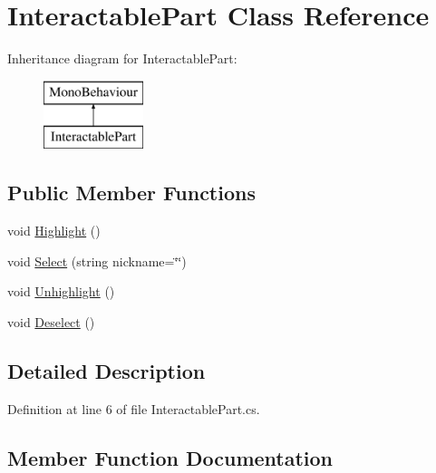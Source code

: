 \hypertarget{class_interactable_part}{}\section{Interactable\+Part Class Reference}
\label{class_interactable_part}
Inheritance diagram for Interactable\+Part\+:\begin{figure}[H]
\begin{center}
\leavevmode
\includegraphics[height=2.000000cm]{class_interactable_part}
\end{center}
\end{figure}
\subsection*{Public Member Functions}
\begin{DoxyCompactItemize}
\item 
void \mbox{\hyperlink{class_interactable_part_a2f585007164fdf0f03073740b4a24731}{Highlight}} ()
\item 
void \mbox{\hyperlink{class_interactable_part_a8d39a62c630d0e7b01821974356188f3}{Select}} (string nickname=\char`\"{}\char`\"{})
\item 
void \mbox{\hyperlink{class_interactable_part_a1babfa8c538301b50ff51843fae6e663}{Unhighlight}} ()
\item 
void \mbox{\hyperlink{class_interactable_part_aa2727fdfaa9fbb4ee26ac4c6c8f10302}{Deselect}} ()
\end{DoxyCompactItemize}


\subsection{Detailed Description}


Definition at line 6 of file Interactable\+Part.\+cs.



\subsection{Member Function Documentation}
\mbox{\label{class_interactable_part_aa2727fdfaa9fbb4ee26ac4c6c8f10302}} 
